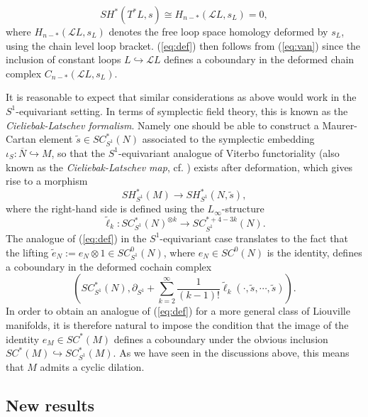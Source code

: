 \documentclass[a4paper]{article}
\numberwithin{equation}{section}
\begin{document}
\begin{equation}\label{eq:van}
\mathit{SH}^\ast(T^\ast L,s)\cong H_{n-\ast}(\mathcal{L}L,s_L)=0,
\end{equation}
where $H_{n-\ast}(\mathcal{L}L,s_L)$ denotes the free loop space homology deformed by $s_L$, using the chain level loop bracket. (\ref{eq:def}) then follows from (\ref{eq:van}) since the inclusion of constant loops $L\hookrightarrow\mathcal{L}L$ defines a coboundary in the deformed chain complex $C_{n-\ast}(\mathcal{L}L,s_L)$.

It is reasonable to expect that similar considerations as above would work in the $S^1$-equivariant setting. In terms of symplectic field theory, this is known as the \textit{Cieliebak-Latschev formalism}. Namely one should be able to construct a Maurer-Cartan element $\tilde{s}\in\mathit{SC}_{S^1}^\ast(N)$ associated to the symplectic embedding $\iota_S:\overline{N}\hookrightarrow M$, so that the $S^1$-equivariant analogue of Viterbo functoriality (also known as the \textit{Cieliebak-Latschev map}, cf. \cite{cl,cg}) exists after deformation, which gives rise to a morphism
\begin{equation}\label{eq:CL}
\mathit{SH}^\ast_{S^1}(M)\rightarrow\mathit{SH}_{S^1}^\ast(N,\tilde{s}),
\end{equation}
where the right-hand side is defined using the $L_\infty$-structure
\begin{equation}
\tilde{\ell}_k:\mathit{SC}_{S^1}^\ast(N)^{\otimes k}\rightarrow\mathit{SC}_{S^1}^{\ast+4-3k}(N).
\end{equation}
The analogue of (\ref{eq:def}) in the $S^1$-equivariant case translates to the fact that the lifting $\tilde{e}_N:=e_N\otimes1\in\mathit{SC}_{S^1}^0(N)$, where $e_N\in\mathit{SC}^0(N)$ is the identity, defines a coboundary in the deformed cochain complex
\begin{equation}
\left(\mathit{SC}_{S^1}^\ast(N),\partial_{S^1}+\sum_{k=2}^\infty\frac{1}{(k-1)!}\tilde{\ell}_k(\cdot,\tilde{s},\cdots,\tilde{s})\right).
\end{equation}
In order to obtain an analogue of (\ref{eq:def}) for a more general class of Liouville manifolds, it is therefore natural to impose the condition that the image of the identity $e_M\in\mathit{SC}^\ast(M)$ defines a coboundary under the obvious inclusion $\mathit{SC}^\ast(M)\hookrightarrow\mathit{SC}_{S^1}^\ast(M)$. As we have seen in the discussions above, this means that $M$ admits a cyclic dilation.

\subsection{New results}\label{section:results}
\end{document}
